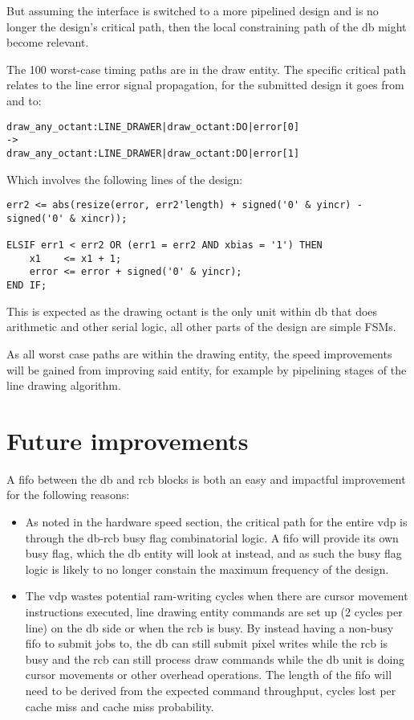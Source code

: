 \documentclass[]{article}
\begin{document}
But assuming the interface is switched to a more pipelined design and is no longer the design's critical path, then the local constraining path of the db might become relevant. 

The 100 worst-case timing paths are in the draw entity. The specific critical path relates to the line error signal propagation, for the submitted design it goes from and to:
\begin{verbatim}
draw_any_octant:LINE_DRAWER|draw_octant:DO|error[0]
->
draw_any_octant:LINE_DRAWER|draw_octant:DO|error[1]
\end{verbatim}

Which involves the following lines of the design:

\begin{verbatim}
err2 <= abs(resize(error, err2'length) + signed('0' & yincr) - signed('0' & xincr));

ELSIF err1 < err2 OR (err1 = err2 AND xbias = '1') THEN
    x1    <= x1 + 1;
    error <= error + signed('0' & yincr);
END IF;

\end{verbatim}
This is expected as the drawing octant is the only unit within db that does arithmetic and other serial logic, all other parts of the design are simple FSMs.

As all worst case paths are within the drawing entity, the speed improvements will be gained from improving said entity, for example by pipelining stages of the line drawing algorithm.

\section{Future improvements} %
\label{sec:future_improvements}


A fifo between the db and rcb blocks is both an easy and impactful improvement for the following reasons:
\begin{itemize}
	\item As noted in the hardware speed section, the critical path for the entire vdp is through the db-rcb busy flag combinatorial logic. A fifo will provide its own busy flag, which the db entity will look at instead, and as such the busy flag logic is likely to no longer constain the maximum frequency of the design.
	\item The vdp wastes potential ram-writing cycles when there are cursor movement instructions executed, line drawing entity commands are set up (2 cycles per line) on the db side or when the rcb is busy. By instead having a non-busy fifo to submit jobs to, the db can still submit pixel writes while the rcb is busy and the rcb can still process draw commands while the db unit is doing cursor movements or other overhead operations. The length of the fifo will need to be derived from the expected command throughput, cycles lost per cache miss and cache miss probability.
\end{itemize}
\end{document}
